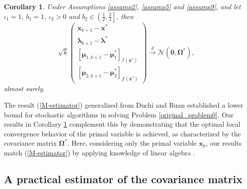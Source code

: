 \documentclass[aos]{imsart}
\numberwithin{equation}{section}
\theoremstyle{plain}
\newtheorem{corollary}{Corollary}
\begin{document}
\begin{corollary}
\label{coro_optimality}
     Under Assumptions \ref{assump2}, \ref{assump5} and \ref{assump9}, and let $\iota_1 = 1$, $b_1 = 1$, $\iota_2 > 0$ and $b_2 \in \left( \frac{1}{2}, \frac{2}{3} \right]$, then 
    \begin{equation}
        \sqrt{k} \left( \begin{array}{c}
    \bm{x}_{k+1} - \bm{x}^{*}  \\
    \bm{\lambda}_{k+1} - \bm{\lambda}^{*} \\
    \left[ \bm{\mu}_{1,k+1} - \bm{\mu}_{1}^{*}\right]_{\mathcal{I}(\bm{x}^{*})} \\
    \left[ \bm{\mu}_{2,k+1} - \bm{\mu}_{2}^{*} \right]_{\mathcal{J}(\bm{x}^{*})} 
    \end{array} \right) \stackrel{d}{\longrightarrow} \mathcal{N} \left( \bm{0}, \bm{\Omega}^{*} \right),
    \end{equation}
    almost surely. 
\end{corollary}


The result (\ref{M-estimator}) generalized from Duchi and Ruan \cite[Theorem~1]{duchi2021asymptotic} established a lower bound for stochastic algorithms in solving Problem \eqref{original_problem0}. 
Our results in Corollary \ref{coro_optimality} complement this by demonstrating that the optimal local convergence behavior of the primal variable is achieved, as characterized by the covariance matrix $\bm{\Omega}^{*}$. Here, considering only the primal variable $\bm{x}_k$, our results match (\ref{M-estimator}) by applying knowledge of linear algebra \cite[Corollary~2.3]{tian2009inverse}.

\subsection{A practical estimator of the covariance matrix}
\end{document}
